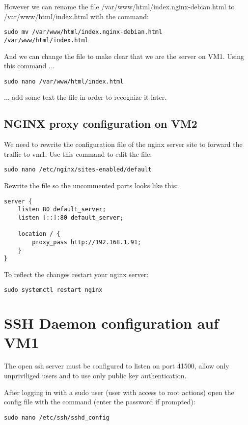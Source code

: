 \documentclass[10pt,a4paper]{article}
\begin{document}
However we can rename the file /var/www/html/index.nginx-debian.html to /var/www/html/index.html with the command:
\begin{verbatim}
sudo mv /var/www/html/index.nginx-debian.html 
/var/www/html/index.html
\end{verbatim}

And we can change the file to make clear that we are the server on VM1. Using this command ...
\begin{verbatim}
sudo nano /var/www/html/index.html
\end{verbatim}

... add some text the file in order to recognize it later.

\subsection{NGINX proxy configuration on VM2}
We need to rewrite the configuration file of the nginx server site to forward the traffic to vm1. Use this command to edit the file:
\begin{verbatim}
sudo nano /etc/nginx/sites-enabled/default
\end{verbatim}

Rewrite the file so the uncommented parts looks like this:
\begin{verbatim}
server {
	listen 80 default_server;
	listen [::]:80 default_server;
	
	location / {
		proxy_pass http://192.168.1.91;
	}
}
\end{verbatim}

To reflect the changes restart your nginx server:
\begin{verbatim}
sudo systemctl restart nginx
\end{verbatim}

\newpage
\section{SSH Daemon configuration auf VM1}
The open ssh server must be configured to listen on port 41500, allow only unpriviliged users and to use only public key authentication.

After logging in with a sudo user (user with access to root actions) open the config file with the command (enter the password if prompted):

\begin{verbatim}
sudo nano /etc/ssh/sshd_config
\end{verbatim}
\end{document}
